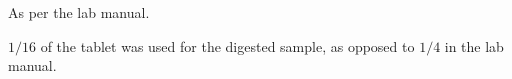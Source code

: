 \documentclass[main.tex]{subfiles}
\begin{document}
As per the lab manual.
\autocite{lab_manual}

$1/16$ of the tablet was used for the digested sample, as opposed to $1/4$ in the lab manual.
\end{document}

